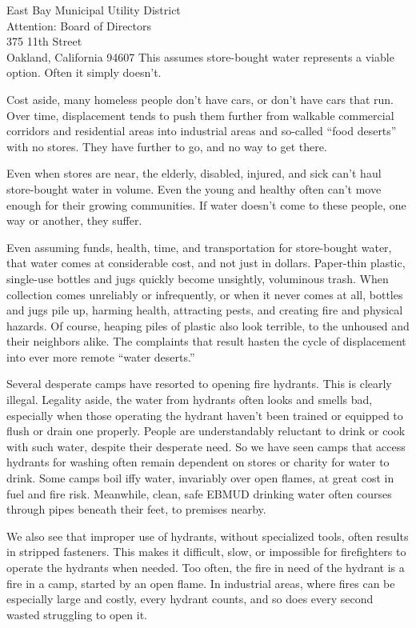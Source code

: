 \documentclass[letterpaper]{letter}
\begin{document}
\begin{letter}{%
    East Bay Municipal Utility District\\
    Attention: Board of Directors\\
    375 11th Street\\
    Oakland, California 94607}
    This assumes store-bought water represents a viable option. Often it simply doesn’t.

    Cost aside, many homeless people don’t have cars, or don’t have cars that run. Over time, displacement tends to push them further from walkable commercial corridors and residential areas into industrial areas and so-called “food deserts” with no stores. They have further to go, and no way to get there.

    Even when stores are near, the elderly, disabled, injured, and sick can’t haul store-bought water in volume. Even the young and healthy often can’t move enough for their growing communities. If water doesn’t come to these people, one way or another, they suffer.

    Even assuming funds, health, time, and transportation for store-bought water, that water comes at considerable cost, and not just in dollars. Paper-thin plastic, single-use bottles and jugs quickly become unsightly, voluminous trash. When collection comes unreliably or infrequently, or when it never comes at all, bottles and jugs pile up, harming health, attracting pests, and creating fire and physical hazards. Of course, heaping piles of plastic also look terrible, to the unhoused and their neighbors alike. The complaints that result hasten the cycle of displacement into ever more remote “water deserts.”

    Several desperate camps have resorted to opening fire hydrants. This is clearly illegal. Legality aside, the water from hydrants often looks and smells bad, especially when those operating the hydrant haven’t been trained or equipped to flush or drain one properly. People are understandably reluctant to drink or cook with such water, despite their desperate need. So we have seen camps that access hydrants for washing often remain dependent on stores or charity for water to drink. Some camps boil iffy water, invariably over open flames, at great cost in fuel and fire risk. Meanwhile, clean, safe EBMUD drinking water often courses through pipes beneath their feet, to premises nearby.

    We also see that improper use of hydrants, without specialized tools, often results in stripped fasteners. This makes it difficult, slow, or impossible for firefighters to operate the hydrants when needed. Too often, the fire in need of the hydrant is a fire in a camp, started by an open flame. In industrial areas, where fires can be especially large and costly, every hydrant counts, and so does every second wasted struggling to open it.


\end{letter}
\end{document}
